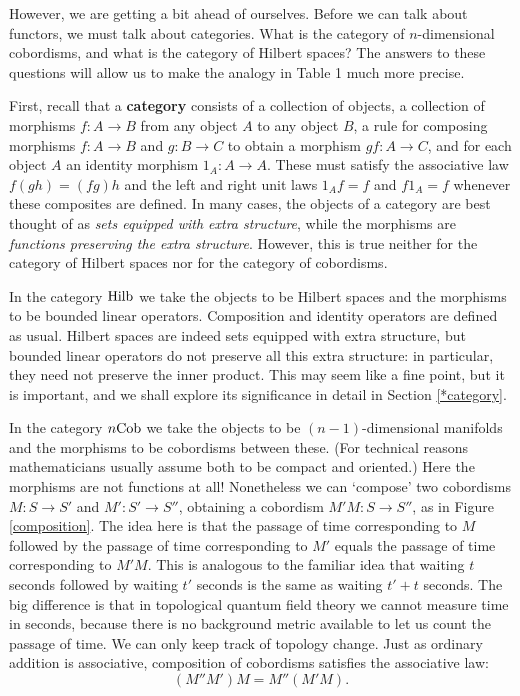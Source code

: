 \documentclass{article}
\newcommand{\Hilb}{{\rm Hilb}}
\newcommand{\Cob}{{\rm Cob}}
\renewcommand{\to}{\rightarrow}
\newcommand{\maps}{\colon}
\begin{document}
However, we are getting a bit ahead of ourselves.  Before we can
talk about functors, we must talk about categories.  What is the 
category of $n$-dimensional cobordisms, and what is the category of 
Hilbert spaces?  The answers to these questions will allow us to make 
the analogy in Table 1 much more precise.

First, recall that a {\bf category} consists of a collection of 
objects, a collection of morphisms $f \maps A \to B$ from any object 
$A$ to any object $B$, a rule for composing morphisms $f \maps A \to B$ 
and $g \maps B \to C$ to obtain a morphism $gf \maps A \to C$, and for 
each object $A$ an identity morphism $1_A \maps A \to A$.  These must 
satisfy the associative law $f(gh) = (fg)h$ and the left and right unit 
laws $1_A f = f$ and $f 1_A = f$ whenever these composites are defined.
In many cases, the objects of a category are best thought of as
{\it sets equipped with extra structure}, while the morphisms are 
{\it functions preserving the extra structure}.  However, this is true
neither for the category of Hilbert spaces nor for the category of 
cobordisms.  

In the category $\Hilb$ we take the objects to be Hilbert spaces
and the morphisms to be bounded linear operators.  Composition and 
identity operators are defined as usual.  Hilbert spaces are indeed 
sets equipped with extra structure, but bounded linear operators do 
not preserve all this extra structure: in particular, they need not 
preserve the inner product.  This may seem like a fine point, but it 
is important, and we shall explore its significance in detail in 
Section \ref{*category}.

In the category $n\Cob$ we take the objects to be $(n-1)$-dimensional
manifolds and the morphisms to be cobordisms between these.  (For 
technical reasons mathematicians usually assume both to be compact and 
oriented.)  Here the morphisms are not functions at all!  Nonetheless 
we can `compose' two cobordisms $M\maps S \to S'$ and 
$M' \maps S' \to S''$, obtaining a cobordism $M' M \maps S \to S''$, as
in Figure \ref{composition}.  The idea here is that the passage of time 
corresponding to $M$ followed by the passage of time corresponding to 
$M'$ equals the passage of time corresponding to $M'M$.   This is 
analogous to the familiar idea that waiting $t$ seconds followed by 
waiting $t'$ seconds is the same as waiting $t'+t$ seconds. 
The big difference is that in topological quantum field theory we 
cannot measure time in seconds, because there is no background metric 
available to let us count the passage of time.  We can only keep track 
of topology change.  Just as ordinary addition is associative, 
composition of cobordisms satisfies the associative law:
\[                (M'' M') M = M'' (M' M)     .        \] 
\end{document}
